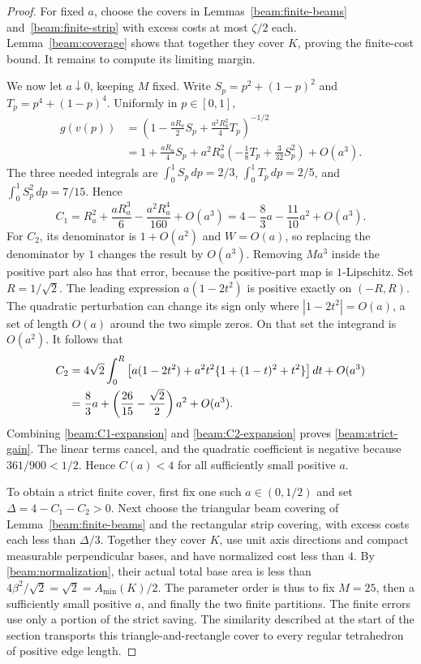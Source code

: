 \begin{proof}
For fixed $a$, choose the covers in Lemmas~\ref{beam:finite-beams}
and~\ref{beam:finite-strip} with excess costs at most $\zeta/2$ each.
Lemma~\ref{beam:coverage} shows that together they cover $K$, proving
the finite-cost bound. It remains to compute its limiting margin.

We now let $a\downarrow0$, keeping $M$ fixed. Write
$S_p=p^2+(1-p)^2$ and $T_p=p^4+(1-p)^4$. Uniformly in $p\in[0,1]$,
\begin{align*}
 g(v(p))
 &=\left(1-\frac{aR_a}{2}S_p+\frac{a^2R_a^2}{4}T_p\right)^{-1/2}\\
 &=1+\frac{aR_a}{4}S_p
      +a^2R_a^2\left(-\frac18T_p+\frac{3}{32}S_p^2\right)+O(a^3).
\end{align*}
The three needed integrals are
$\int_0^1S_p\,dp=2/3$, $\int_0^1T_p\,dp=2/5$, and
$\int_0^1S_p^2\,dp=7/15$. Hence
\begin{equation}\label{beam:C1-expansion}
 C_1=R_a^2+\frac{aR_a^3}{6}-\frac{a^2R_a^4}{160}+O(a^3)
     =4-\frac83a-\frac{11}{10}a^2+O(a^3).
\end{equation}
For $C_2$, its denominator is $1+O(a^2)$ and $W=O(a)$, so replacing
the denominator by $1$ changes the result by $O(a^3)$. Removing $Ma^3$
inside the positive part also has that error, because the positive-part
map is $1$-Lipschitz. Set $R=1/\sqrt{2}$. The leading expression
$a(1-2t^2)$ is positive exactly on $(-R,R)$. The quadratic perturbation
can change its sign only where $|1-2t^2|=O(a)$, a set of length $O(a)$
around the two simple zeros. On that set the integrand is $O(a^2)$.
It follows that
\begin{align}
 C_2
 &=4\sqrt{2}\int_0^R
     \left[a(1-2t^2)+a^2t^2\{1+(1-t)^2+t^2\}\right]dt+O(a^3)
       \notag\\
 &=\frac83a+\left(\frac{26}{15}-\frac{\sqrt{2}}2\right)a^2+O(a^3).
       \label{beam:C2-expansion}
\end{align}
Combining \eqref{beam:C1-expansion} and \eqref{beam:C2-expansion}
proves \eqref{beam:strict-gain}. The linear terms cancel, and the
quadratic coefficient is negative because $361/900<1/2$.
Hence $C(a)<4$ for all sufficiently small positive $a$.

To obtain a strict finite cover, first fix one such $a\in(0,1/2)$ and set
$\Delta=4-C_1-C_2>0$. Next choose the triangular beam covering of Lemma~\ref{beam:finite-beams}
and the rectangular strip covering, with excess costs each less than
$\Delta/3$. Together they cover $K$,
use unit axis directions and compact measurable perpendicular bases,
and have normalized cost less than $4$. By
\eqref{beam:normalization}, their actual total base area is less than
$4\beta^2/\sqrt{2}=\sqrt{2}=A_{\min}(K)/2$.
The parameter order is thus to fix $M=25$, then a sufficiently small
positive $a$, and finally the two finite partitions. The finite errors
use only a portion of the strict saving. The similarity described at
the start of the section transports this triangle-and-rectangle cover
to every regular tetrahedron of positive edge length.
\end{proof}
